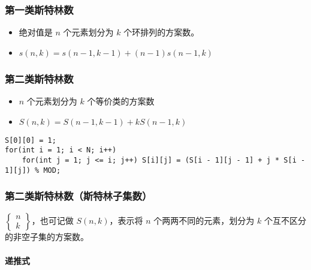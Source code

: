 \documentclass[]{article}
\providecommand{\tightlist}{%
  \setlength{\itemsep}{0pt}\setlength{\parskip}{0pt}}
\let\oldparagraph\paragraph
\renewcommand{\paragraph}[1]{\oldparagraph{#1}\mbox{}}
\begin{document}
\hypertarget{ux7b2cux4e00ux7c7bux65afux7279ux6797ux6570}{%
\subsubsection{第一类斯特林数}\label{ux7b2cux4e00ux7c7bux65afux7279ux6797ux6570}}

\begin{itemize}
\tightlist
\item
  绝对值是 \(n\) 个元素划分为 \(k\) 个环排列的方案数。
\item
  \(s(n,k)=s(n-1,k-1)+(n-1)s(n-1,k)\)
\end{itemize}

\hypertarget{ux7b2cux4e8cux7c7bux65afux7279ux6797ux6570}{%
\subsubsection{第二类斯特林数}\label{ux7b2cux4e8cux7c7bux65afux7279ux6797ux6570}}

\begin{itemize}
\tightlist
\item
  \(n\) 个元素划分为 \(k\) 个等价类的方案数
\item
  \(S(n, k)=S(n-1,k-1)+kS(n-1, k)\)
\end{itemize}

\begin{verbatim}
S[0][0] = 1;
for(int i = 1; i < N; i++)
    for(int j = 1; j <= i; j++) S[i][j] = (S[i - 1][j - 1] + j * S[i - 1][j]) % MOD;
\end{verbatim}

\hypertarget{ux7b2cux4e8cux7c7bux65afux7279ux6797ux6570ux65afux7279ux6797ux5b50ux96c6ux6570}{%
\subsubsection{\texorpdfstring{\textbf{第二类斯特林数}（斯特林子集数）}{第二类斯特林数（斯特林子集数）}}\label{ux7b2cux4e8cux7c7bux65afux7279ux6797ux6570ux65afux7279ux6797ux5b50ux96c6ux6570}}

\(\begin{Bmatrix}n\\ k\end{Bmatrix}\)，也可记做 \(S(n,k)\)，表示将 \(n\)
个两两不同的元素，划分为 \(k\) 个互不区分的非空子集的方案数。

\hypertarget{ux9012ux63a8ux5f0f}{%
\paragraph{递推式}\label{ux9012ux63a8ux5f0f}}
\end{document}
